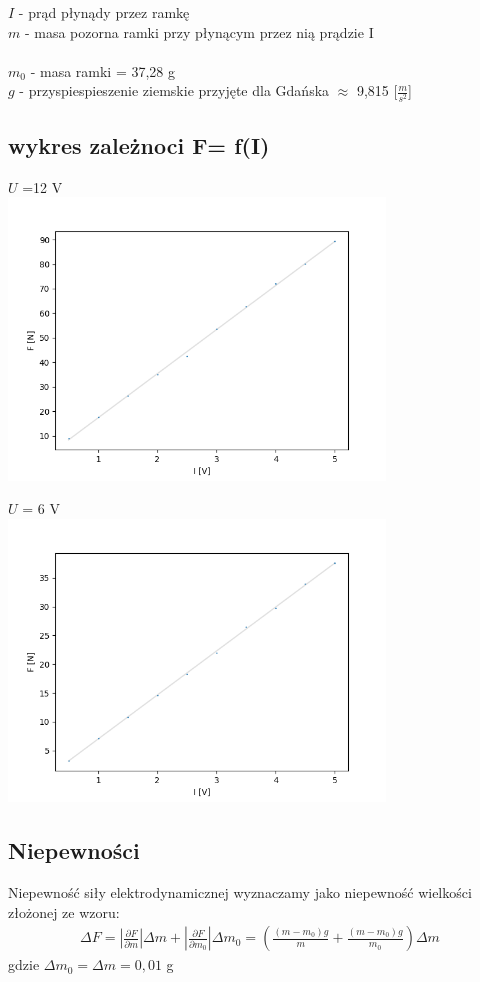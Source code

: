 \documentclass{article}
\begin{document}
$I$ - prąd płynądy przez ramkę \\
$m$ - masa pozorna ramki przy płynącym przez nią prądzie I \\\\
$m_0$ - masa ramki = 37,28 g\\
$g$ - przyspiespieszenie ziemskie przyjęte dla Gdańska $\approx$ 9,815 [$\frac{m}{s^2}$]

\subsection{wykres zależnoci F= f(I)}
$U$ =12 V\\

\includegraphics[width=10cm]{F(I)_12V}

$U$ = 6 V\\
\includegraphics[width=10cm]{F(I)_6V}
\subsection{Niepewności}
Niepewność siły elektrodynamicznej wyznaczamy jako niepewność wielkości złożonej ze wzoru:\\
\begin{gather*}
		\Delta F= |\frac{\partial F}{\partial m}| \Delta m + |\frac{\partial F}{\partial m_0}| \Delta m_0  = (\frac{(m - m_0)g }{m} + \frac{(m - m_0)g }{m_0}) \Delta m
\end{gather*}
gdzie $\Delta m_0 =\Delta m = 0,01$ g
\end{document}
